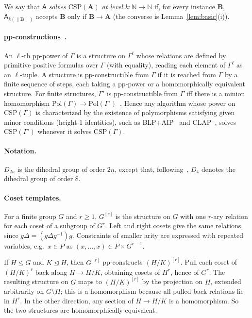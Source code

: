 \documentclass[11pt]{article}
\theoremstyle{definition}
\theoremstyle{remark}
\newcommand{\Pol}{\mathrm{Pol}}
\newcommand{\Csp}{\mathrm{CSP}}
\newcommand{\size}[1]{\lVert #1\rVert}
\begin{document}
We say that $\mathsf A$ \emph{solves $\Csp(\mathbf A)$ at level} $k\colon\mathbb
N\to\mathbb N$ if, for every instance $\mathbf B$, $\mathsf A_{k(\size{\mathbf
B})}$ accepts $\mathbf B$ only if $\mathbf B\to\mathbf A$ (the converse is
Lemma~\ref{lem:basic}(i)).

\paragraph{pp-constructions~\cite{BOP18}.} An $\ell$-th pp-power of $\Gamma$ is
a structure on $\Gamma^\ell$ whose relations are defined by primitive positive
formulas over $\Gamma$ (with equality), reading each element of $\Gamma^\ell$
as an $\ell$-tuple. A structure is pp-constructible from $\Gamma$ if it is
reached from $\Gamma$ by a finite sequence of steps, each taking a pp-power or a
homomorphically equivalent structure. For finite structures, $\Gamma'$ is
pp-constructible from $\Gamma$ iff there is a minion homomorphism
$\Pol(\Gamma)\to\Pol(\Gamma')$~\cite{BOP18}. Hence any algorithm whose power on
$\Csp(\Gamma)$ is characterized by the existence of polymorphisms satisfying
given minor conditions (height-1 identities), such as BLP+AIP~\cite{BGWZ20} and
CLAP~\cite{CZ23,Zhu25}, solves $\Csp(\Gamma')$ whenever it solves
$\Csp(\Gamma)$.

\paragraph{Notation.} $D_{2n}$ is the dihedral group of order $2n$, except that,
following~\cite{Zhu25,BHZ26}, $D_4$ denotes the dihedral group of order $8$.

\paragraph{Coset templates.} For a finite group $G$ and $r\ge1$, $G^{[r]}$ is
the structure on $G$ with one $r$-ary relation for each coset of a subgroup of
$G^r$. Left and right cosets give the same relations, since
$g\Delta=(g\Delta g^{-1})g$. Constraints of smaller arity are expressed with
repeated variables, e.g.\ $x\in P$ as $(x,\dots,x)\in P\times G^{r-1}$.

If $H\le G$ and $K\unlhd H$, then $G^{[r]}$ pp-constructs $(H/K)^{[r]}$. Pull
each coset of $(H/K)^r$ back along $H\to H/K$, obtaining cosets of $H^r$, hence
of $G^r$. The resulting structure on $G$ maps to $(H/K)^{[r]}$ by the projection
on $H$, extended arbitrarily on $G\setminus H$; this is a homomorphism because
all pulled-back relations lie in $H^r$. In the other direction, any section of
$H\to H/K$ is a homomorphism. So the two structures are homomorphically
equivalent.
\end{document}
